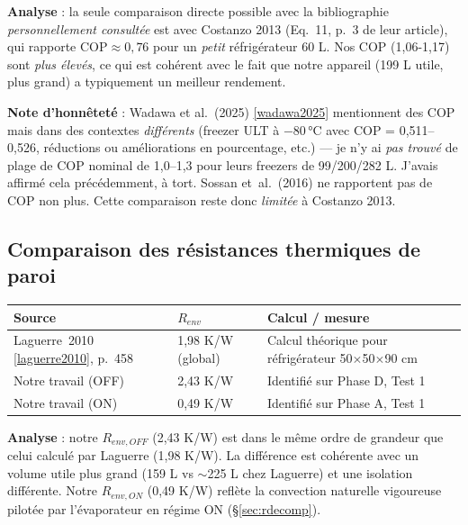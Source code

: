 \documentclass[11pt,a4paper]{article}
\begin{document}
\textbf{Analyse} : la seule comparaison directe possible avec la bibliographie
\emph{personnellement consultée} est avec Costanzo 2013 (Eq.~11, p.~3 de leur article),
qui rapporte $\mathrm{COP} \approx 0{,}76$ pour un \emph{petit} réfrigérateur 60 L. Nos
COP (1,06-1,17) sont \emph{plus élevés}, ce qui est cohérent avec le fait que notre
appareil (199 L utile, plus grand) a typiquement un meilleur rendement.

\begin{honnete}
\textbf{Note d'honnêteté} : Wadawa et al.\ (2025) \ref{wadawa2025} mentionnent des COP
mais dans des contextes \emph{différents} (freezer ULT à $-80\,$°C avec COP = 0,511--0,526,
réductions ou améliorations en pourcentage, etc.) — je n'y ai \emph{pas trouvé} de plage
de COP nominal de 1,0--1,3 pour leurs freezers de 99/200/282 L. J'avais affirmé cela
précédemment, à tort. Sossan et~al.\ (2016) ne rapportent pas de COP non plus. Cette
comparaison reste donc \emph{limitée} à Costanzo 2013.
\end{honnete}

\subsection{Comparaison des résistances thermiques de paroi}

\begin{center}
\renewcommand{\arraystretch}{1.3}
\begin{tabular}{p{4.5cm}p{3cm}p{5.5cm}}
\toprule
\textbf{Source} & \textbf{$R_{env}$} & \textbf{Calcul / mesure} \\
\midrule
Laguerre~2010 \ref{laguerre2010}, p.~458 & 1,98 K/W (global) & Calcul théorique pour
réfrigérateur 50$\times$50$\times$90 cm \\
Notre travail (OFF) & 2,43 K/W & Identifié sur Phase D, Test 1 \\
Notre travail (ON) & 0,49 K/W & Identifié sur Phase A, Test 1 \\
\bottomrule
\end{tabular}
\end{center}

\textbf{Analyse} : notre $R_{env,OFF}$ (2,43 K/W) est dans le même ordre de grandeur que
celui calculé par Laguerre (1,98 K/W). La différence est cohérente avec un volume utile
plus grand (159 L vs $\sim$225 L chez Laguerre) et une isolation différente. Notre
$R_{env,ON}$ (0,49 K/W) reflète la convection naturelle vigoureuse pilotée par
l'évaporateur en régime ON (\S\ref{sec:rdecomp}).
\end{document}
